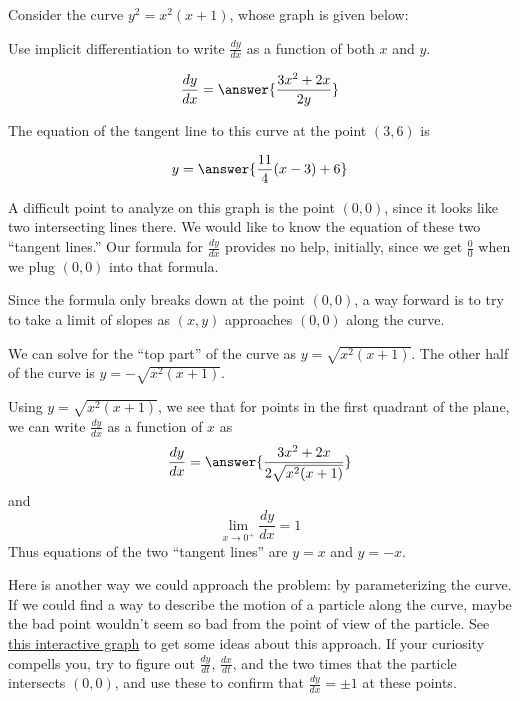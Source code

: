 \documentclass{ximera}
\author{Steven Gubkin}
\begin{document}
\begin{exercise}

Consider the curve  $y^2 = x^2(x+1)$, whose graph is given below:

\begin{image}
\end{image}

Use implicit differentiation to write $\frac{dy}{dx}$ as a function of both $x$ and $y$.

\[
\frac{dy}{dx} = \answer{\frac{3x^2+2x}{2y}}
\]

The equation of the tangent line to this curve at the point $(3,6)$ is

\[
y = \answer{\frac{11}{4}(x-3)+6}
\]

A difficult point to analyze on this graph is the point $(0,0)$, since
it looks like two intersecting lines there.  We would like to know the
equation of these two ``tangent lines.''  Our formula for
$\frac{dy}{dx}$ provides no help, initially, since we get
$\frac{0}{0}$ when we plug $(0,0)$ into that formula.

Since the formula only breaks down at the point $(0,0)$, a way forward
is to try to take a limit of slopes as $(x,y)$ approaches $(0,0)$
along the curve.

We can solve for the ``top part'' of the curve as $y =
\sqrt{x^2(x+1)}$.  The other half of the curve is $y =
-\sqrt{x^2(x+1)}$.

Using $y = \sqrt{x^2(x+1)}$, we see that for points in the first
quadrant of the plane, we can write $\frac{dy}{dx}$ as a function of
$x$ as
\[
\frac{dy}{dx} = \answer{\frac{3x^2+2x}{2\sqrt{x^2(x+1)}}}
\]
and
\[
\lim_{x \to 0^+} \frac{dy}{dx} = 1
\]
Thus equations of the two ``tangent lines'' are $y=x$ and $y=-x$.

Here is another way we could approach the problem: by parameterizing
the curve.  If we could find a way to describe the motion of a
particle along the curve, maybe the bad point wouldn't seem so bad
from the point of view of the particle. See
\href{https://www.desmos.com/calculator/py0camtwlg}{this interactive
  graph} to get some ideas about this approach.  If your curiosity
compells you, try to figure out $\frac{dy}{dt}$, $\frac{dx}{dt}$, and
the two times that the particle intersects $(0,0)$, and use these to
confirm that $\frac{dy}{dx} = \pm 1$ at these points.


\end{exercise}
\end{document}
